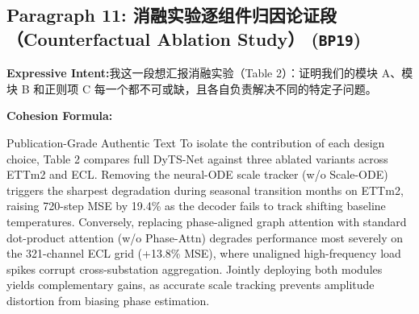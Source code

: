 \subsection*{Paragraph 11: 消融实验逐组件归因论证段（Counterfactual Ablation Study） (\texttt{BP19})}
\noindent\textbf{Expressive Intent:}\enspace 我这一段想汇报消融实验（Table 2）：证明我们的模块 A、模块 B 和正则项 C 每一个都不可或缺，且各自负责解决不同的特定子问题。\par
\noindent\textbf{Cohesion Formula:}\par\vspace{4pt}
\begin{ExampleBox}{Publication-Grade Authentic Text}
To isolate the contribution of each design choice, Table 2 compares full DyTS-Net against three ablated variants across ETTm2 and ECL. Removing the neural-ODE scale tracker (w/o Scale-ODE) triggers the sharpest degradation during seasonal transition months on ETTm2, raising 720-step MSE by 19.4\% as the decoder fails to track shifting baseline temperatures. Conversely, replacing phase-aligned graph attention with standard dot-product attention (w/o Phase-Attn) degrades performance most severely on the 321-channel ECL grid (+13.8\% MSE), where unaligned high-frequency load spikes corrupt cross-substation aggregation. Jointly deploying both modules yields complementary gains, as accurate scale tracking prevents amplitude distortion from biasing phase estimation.
\end{ExampleBox}
